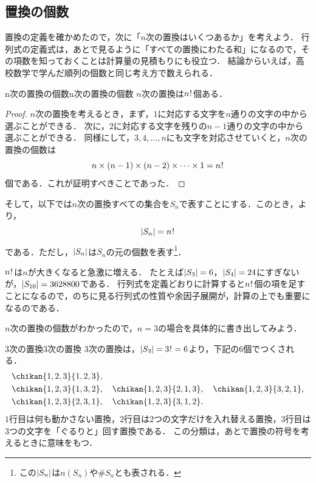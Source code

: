 \subsection{置換の個数}

置換の定義を確かめたので，次に「$n$次の置換はいくつあるか」を考えよう．
行列式の定義式は，あとで見るように「すべての置換にわたる和」になるので，その項数を知っておくことは計算量の見積もりにも役立つ．
結論からいえば，高校数学で学んだ順列の個数と同じ考え方で数えられる．

\begin{prop}{n次の置換の個数}{n次の置換の個数}
  $n$次の置換は$n\mkern1mu!\mkern1mu$個ある．
\end{prop}

\begin{tleftbar}
\begin{proof}
  $n$次の置換を考えるとき，まず，$1$に対応する文字を$n$通りの文字の中から選ぶことができる．
  次に，$2$に対応する文字を残りの$n-1$通りの文字の中から選ぶことができる．
  同様にして，$3,4,\ldots,n$にも文字を対応させていくと，$n$次の置換の個数は
  \[
  n \times (n-1) \times (n-2) \times \cdots \times 1 = n\mkern1mu!\mkern1mu
  \]
  個である．これが証明すべきことであった．
\end{proof}
\end{tleftbar}

そして，以下では$n$次の置換すべての集合を$S_n$で表すことにする．このとき，より，
\[
\lvert S_n\rvert = n\mkern1mu!\mkern1mu
\]
である．ただし，$\lvert S_n\rvert$は$S_n$の元の個数を表す\footnote{この$\lvert S_n\rvert$は$n(S_n)$や$\# S_n$とも表される．}．

$n\mkern1mu!\mkern1mu$は$n$が大きくなると急激に増える．
たとえば$\lvert S_3\rvert = 6$，$\lvert S_4\rvert = 24$にすぎないが，$\lvert S_{10}\rvert = 3628800$である．
行列式を定義どおりに計算すると$n\mkern1mu!\mkern1mu$個の項を足すことになるので，のちに見る行列式の性質や余因子展開が，計算の上でも重要になるのである．

$n$次の置換の個数がわかったので，$n = 3$の場合を具体的に書き出してみよう．

\begin{example}{3次の置換}{3次の置換}
  3次の置換は，$\lvert S_3\rvert = 3\mkern1mu!\mkern1mu = 6$より，下記の$6$個でつくされる．
  \begin{align*}
    &\chikan{1, 2, 3}{1, 2, 3}, \\
    &\chikan{1, 2, 3}{1, 3, 2}, \quad
    \chikan{1, 2, 3}{2, 1, 3},\quad 
    \chikan{1, 2, 3}{3, 2, 1}, \\
    &\chikan{1, 2, 3}{2, 3, 1},\quad 
    \chikan{1, 2, 3}{3, 1, 2}.
  \end{align*}
  $1$行目は何も動かさない置換，$2$行目は$2$つの文字だけを入れ替える置換，$3$行目は$3$つの文字を「ぐるりと」回す置換である．
  この分類は，あとで置換の符号を考えるときに意味をもつ．
\end{example}

